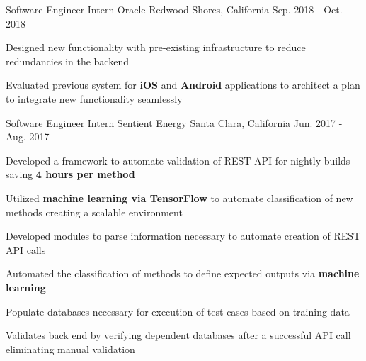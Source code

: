 


\begin{cventries}

\begin{comment}
\cventry
{Software Engineer Intern}
{Microsoft}
{Redmond, Washington}
{Jun. 2018 - Sep. 2018}
{
\begin{cvitems}
\item {Will develop on the frameworks team}
\end{cvitems}
}
\end{comment}

\cventry
{Software Engineer Intern}
{Oracle}
{Redwood Shores, California}
{Sep. 2018 - Oct. 2018}
{
\begin{cvitems}
\item {Designed new functionality with pre-existing infrastructure to reduce redundancies in the backend}
\item {Evaluated previous system for \textbf{iOS} and \textbf{Android} applications to architect a plan to integrate new functionality seamlessly}
\end{cvitems}
}

\cventry
{Software Engineer Intern} %
{Sentient Energy} %
{Santa Clara, California} %
{Jun. 2017 - Aug. 2017} %
{ %
\begin{cvitems}
\item {Developed a framework to automate validation of REST API for nightly builds saving \textbf{4 hours per method}}
\item {Utilized \textbf{machine learning via TensorFlow} to automate classification of new methods creating a scalable environment}
\item {Developed modules to parse information necessary to automate creation of REST API calls}
\item {Automated the classification of methods to define expected outputs via \textbf{machine learning}}
\item {Populate databases necessary for execution of test cases based on training data}
\item {Validates back end by verifying dependent databases after a successful API call eliminating manual validation}
\end{cvitems}
}


\end{cventries}
